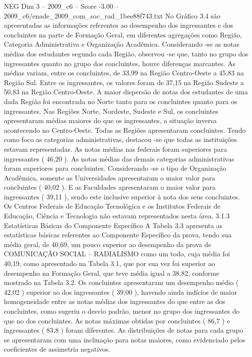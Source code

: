 \begin{textsample}{NEG Dim 3 – 2009\_c6 – Score -3.00 – 2009\_c6/enade\_2009\_com\_soc\_rad\_1bee88f743.txt}
No Gráfico 3.4 são apresentadas as informações referentes ao desempenho dos ingressantes e dos concluintes na parte de Formação Geral, em diferentes agregações como Região, Categoria Administrativa e Organização Acadêmica.
Considerando -se as notas médias dos estudantes segundo cada Região, observou -se que, tanto no grupo dos ingressantes quanto no grupo dos concluintes, houve diferenças marcantes.
As médias variam, entre os concluintes, de 33,99 na Região Centro-Oeste a 45,83 na Região Sul.
Entre os ingressantes, os valores foram de 37,15 na Região Sudeste a 50,83 na Região Centro-Oeste.
A maior dispersão de notas dos estudantes de uma dada Região foi encontrada no Norte tanto para os concluintes quanto para os ingressantes.
Nas Regiões Norte, Nordeste, Sudeste e Sul, os concluintes apresentaram médias maiores do que os ingressantes, a situação inversa acontecendo no Centro-Oeste.
Todas as Regiões apresentaram concluintes.
Tendo como foco as categorias administrativas, destacou -se que todas as instituições estavam representadas.
As notas médias nas federais foram superiores para ingressantes ( 46,20 ).
As notas médias das demais categorias administrativas foram superiores para concluintes.
Considerando -se o tipo de Organização Acadêmica, somente as Universidades apresentaram o maior valor para concluintes ( 40,02 ).
E as Faculdades apresentaram o maior valor para ingressantes ( 39,11 ), sendo este inclusive superior à nota dos seus concluintes.
Os Centros Federais de Educação Tecnológica e os Institutos Federais de Educação, Ciência e Tecnologia não estavam representados nesta área. 3.1.3 Estatísticas Básicas do Componente Específico A Tabela 3.3 apresenta as estatísticas básicas referentes ao Componente Específico da prova, tendo sua média geral, de 40,69, um pouco superior ao desempenho da prova de COMUNICAÇÃO SOCIAL – RADIALISMO como um todo, cuja média foi 40,19, como apresentado na Tabela 3.1, que por sua vez foi superior ao desempenho na Formação Geral, que teve média igual a 38,82, conforme mostrado na Tabela 3.2.
Os concluintes apresentaram um desempenho médio ( 42,02 ) superior ao dos ingressantes ( 39,00 ), havendo ainda indícios de maior homogeneidade entre as notas médias dos ingressantes do que entre as dos concluintes, como sugeriu o desvio padrão, menor no grupo dos ingressantes do que no dos concluintes.
As notas máximas obtidas por concluintes ( 86,7 ) e ingressantes ( 83,8 ) foram diferentes.
As distribuições de notas para cada grupo se apresentaram com uma inclinação para notas maiores, como evidenciado pelos coeficientes de assimetria negativos.

\end{textsample}
